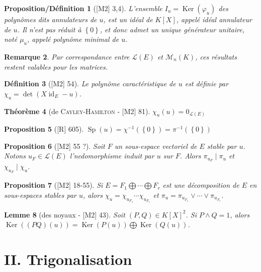\documentclass[10pt, a4paper, parskip=full, twoside, twocolumn]{report}
\newtheorem{definition}{Définition}
\newtheorem{theorem}[definition]{Théorème}
\newtheorem{proposition}[definition]{Proposition}
\newtheorem{proposition_def}[definition]{Proposition/Définition}
\newtheorem{lemma}[definition]{Lemme}
\newtheorem{remark}[definition]{Remarque}
\newcommand{\M}{\mathcal{M}}
\DeclareMathOperator{\Ker}{Ker}
\DeclareMathOperator{\id}{id}
\DeclareMathOperator{\Sp}{Sp}
\begin{document}
\begin{proposition_def}[\textnormal{[M2] 3,4}]
	L'ensemble $I_u = \Ker(\varphi_u)$ des polynômes dits \emph{annulateurs de $u$}, est un idéal de $K[X]$,
	appelé \emph{idéal annulateur de $u$}. Il n'est pas réduit à $\left\{0\right\}$, et 
	donc admet un unique générateur unitaire, noté $\mu_u$, appelé \emph{polynôme minimal de $u$}.
\end{proposition_def}

\begin{remark}
	Par correspondance entre $\mathcal{L}(E)$ et $\M_n(K)$, ces résultats restent valables pour les matrices.
\end{remark}

\begin{definition}[\textnormal{[M2] 54}]
	Le \emph{polynôme caractéristique de $u$} est définie par $\chi_u = \det(X\id_E - u)$.
\end{definition}

\begin{theorem}[de \textsc{Cayley-Hamilton} - \textnormal{[M2] 81}]
	$\chi_u(u) = 0_{\mathcal{L}(E)}$
\end{theorem}

\begin{proposition}[\textnormal{[R] 605}]
	$\Sp(u) = \chi^{-1}(\left\{0\right\}) = \pi^{-1}(\left\{0\right\})$
\end{proposition}

\begin{proposition}[\textnormal{[M2] 55 ?}]
	Soit $F$ un sous-espace vectoriel de $E$ stable par $u$.
	Notons $u_F\in\mathcal{L}(E)$ l'nedomorphisme induit par $u$ sur $F$. Alors $\pi_{u_F} \mid \pi_u$ et $\chi_{u_F} \mid \chi_u$.
\end{proposition}

\begin{proposition}[\textnormal{[M2] 18-55}]
	Si $E = F_1\bigoplus \cdots\bigoplus F_r$ est une décomposition de $E$ en sous-espaces stables par $u$,
	alors $\chi_u = \chi_{u_{F_1}} \cdots \chi_{u_{F_r}}$ et $\pi_u = \pi_{u_{F_1}} \vee \cdots \vee \pi_{u_{F_r}}$.
\end{proposition}

\begin{lemma}[des noyaux - \textnormal{[M2] 43}]
	Soit $(P,Q)\in K[X]^2$. Si $P\wedge Q = 1$, alors
	$\Ker\left(\left(PQ\right)(u)\right) = \Ker(P(u))\bigoplus\Ker(Q(u))$.
\end{lemma}

\section*{II. Trigonalisation}
\end{document}

